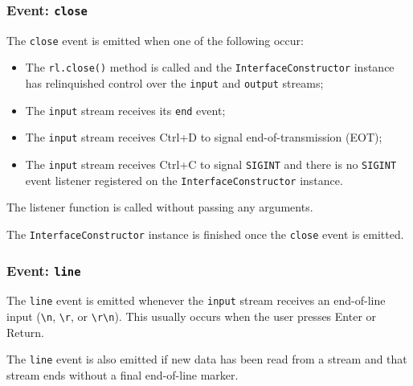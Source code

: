 \subsubsection{\texorpdfstring{Event:
\texttt{\textquotesingle{}close\textquotesingle{}}}{Event: \textquotesingle close\textquotesingle{}}}\label{event-close}

The \texttt{\textquotesingle{}close\textquotesingle{}} event is emitted
when one of the following occur:

\begin{itemize}
\tightlist
\item
  The \texttt{rl.close()} method is called and the
  \texttt{InterfaceConstructor} instance has relinquished control over
  the \texttt{input} and \texttt{output} streams;
\item
  The \texttt{input} stream receives its
  \texttt{\textquotesingle{}end\textquotesingle{}} event;
\item
  The \texttt{input} stream receives Ctrl+D to signal
  end-of-transmission (EOT);
\item
  The \texttt{input} stream receives Ctrl+C to signal \texttt{SIGINT}
  and there is no \texttt{\textquotesingle{}SIGINT\textquotesingle{}}
  event listener registered on the \texttt{InterfaceConstructor}
  instance.
\end{itemize}

The listener function is called without passing any arguments.

The \texttt{InterfaceConstructor} instance is finished once the
\texttt{\textquotesingle{}close\textquotesingle{}} event is emitted.

\subsubsection{\texorpdfstring{Event:
\texttt{\textquotesingle{}line\textquotesingle{}}}{Event: \textquotesingle line\textquotesingle{}}}\label{event-line}

The \texttt{\textquotesingle{}line\textquotesingle{}} event is emitted
whenever the \texttt{input} stream receives an end-of-line input
(\texttt{\textbackslash{}n}, \texttt{\textbackslash{}r}, or
\texttt{\textbackslash{}r\textbackslash{}n}). This usually occurs when
the user presses Enter or Return.

The \texttt{\textquotesingle{}line\textquotesingle{}} event is also
emitted if new data has been read from a stream and that stream ends
without a final end-of-line marker.

